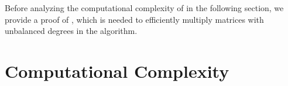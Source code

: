 

Before analyzing the computational complexity of 
in the following section, we provide a proof of ,
which is needed to efficiently multiply matrices with unbalanced degrees
in the algorithm.




\section{Computational Complexity}

\label{sec:complexityNullspaceBasis}

\begin{comment}
The result of the previous section is a recursive algorithm, shown
in \prettyref{alg:minimalNullspaceBasisWithRankProfile} for the computation
of a minimal kernel. It remains to determine the complexity.

%



\subsection{Cost Analysis of Algorithm $\mnb$}
\end{comment}


